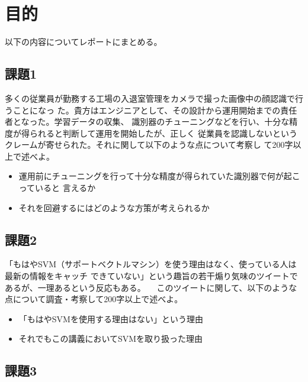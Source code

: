 \section{目的}
以下の内容についてレポートにまとめる。
\subsection{課題1}
多くの従業員が勤務する工場の入退室管理をカメラで撮った画像中の顔認識で行うことになっ
た。貴方はエンジニアとして、その設計から運用開始までの責任者となった。学習データの収集、
識別器のチューニングなどを行い、十分な精度が得られると判断して運用を開始したが、正しく
従業員を認識しないというクレームが寄せられた。それに関して以下のような点について考察し
て200字以上で述べよ。
\begin{itemize}
  \item 運用前にチューニングを行って十分な精度が得られていた識別器で何が起こっていると
  言えるか
  \item それを回避するにはどのような方策が考えられるか
\end{itemize}

\subsection{課題2}
「もはやSVM（サポートベクトルマシン）を使う理由はなく、使っている人は最新の情報をキャッチ
できていない」という趣旨の若干煽り気味のツイートであるが、一理あるという反応もある。
　このツイートに関して、以下のような点について調査・考察して200字以上で述べよ。
\begin{itemize}
  \item 「もはやSVMを使用する理由はない」という理由
  \item それでもこの講義においてSVMを取り扱った理由
\end{itemize}

\subsection{課題3}
